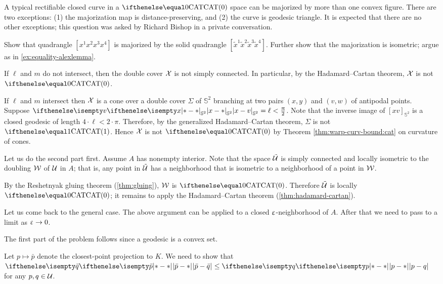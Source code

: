 A typical rectifiable closed curve in a $\CAT0$ space can be majorized by more than one convex figure.
There are two exceptions: (1) the majorization map is distance-preserving, and (2) the curve is geodesic triangle.
It is expected that there are no other exceptions;
this question was asked by Richard Bishop in a private conversation.

Show that quadrangle $[x^1x^2x^3x^4]$ is majorized by the solid quadrangle $[\tilde x^1\tilde x^2\tilde x^3\tilde x^4]$.
Further show that the majorization is isometric;
argue as in \ref{ex:equality-alexlemma}.

If $\ell$ and $m$ do not intersect, then the double cover $\mathcal{X}$ is not simply connected.
In particular, by the Hadamard--Cartan theorem, $\mathcal{X}$ is not $\CAT0$.

If $\ell$ and $m$ intersect then $\mathcal{X}$ is a cone over a double cover $\Sigma$ of $\mathbb{S}^2$ branching at two pairs $(x,y)$ and $(v,w)$ of antipodal points.
Suppose $\dist{x}{v}{\mathbb{S}^2}=\ell<\tfrac\pi2$.
Note that the inverse image of $[xv]_{\mathbb{S}^2}$ is a closed geodesic of length $4\cdot\ell<2\cdot\pi$.
Therefore, by the generalized Hadamard--Cartan theorem, $\Sigma$ is not $\CAT1$. Hence $\mathcal{X}$ is not $\CAT0$ by Theorem \ref{thm:warp-curv-bound:cat}  on curvature of cones.

Let us do the second part first.
Assume $A$ has nonempty interior. 
Note that the space $\tilde{\mathcal{U}}$ is simply connected and locally isometric to the doubling $\mathcal{W}$ of $\mathcal{U}$ in $A$;
that is, any point in $\tilde{\mathcal{U}}$ has a neighborhood 
that is isometric to a neighborhood of a point in $\mathcal{W}$.

By the Reshetnyak gluing theorem (\ref{thm:gluing}), $\mathcal{W}$ is $\CAT0$.
Therefore $\tilde{\mathcal{U}}$ is locally $\CAT0$;
it remains to apply the Hadamard--Cartan theorem (\ref{thm:hadamard-cartan}).

Let us come back to the general case.
The above argument can be applied to a closed $\upvarepsilon$-neighborhood of $A$.
After that we need to pass to a limit as $\eps\to 0$.

The first part of the problem follows since a geodesic is a convex set.

Let $p\mapsto\bar p$ denote the closest-point projection to $K$.
We need to show that $\dist{\bar p}{\bar q}{}\le\dist{ p}{ q}{}$ for any $p,q\in \spc{U}$.

